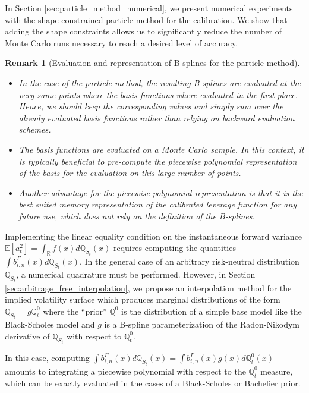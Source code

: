 \documentclass[a4paper]{article}
\newtheorem*{remark}{Remark}
\newcommand{\1}{\textbf{1}}
\newcommand{\Q}{\mathbb{Q}}
\newcommand{\R}{\mathbb{R}}
\newcommand{\E}{\mathbb{E}}
\begin{document}
\par In Section \ref{sec:particle_method_numerical}, we present numerical experiments with the shape-constrained particle method for the calibration. We show that adding the shape constraints allows us to significantly reduce the number of Monte Carlo runs necessary to reach a desired level of accuracy. 
\begin{remark}[Evaluation and representation of B-splines for the particle method]
\begin{itemize}
\item In the case of the particle method, the resulting B-splines are evaluated at the very same points where the basis functions where evaluated in the first place. Hence, we should keep the corresponding values and simply sum over the already evaluated basis functions rather than relying on backward evaluation schemes.
\item The basis functions are evaluated on a Monte Carlo sample. In this context, it is typically beneficial to pre-compute the piecewise polynomial representation of the basis for the evaluation on this large number of points.
\item Another advantage for the piecewise polynomial representation is that it is the best suited memory representation of the calibrated leverage function for any future use, which does not rely on the definition of the B-splines. 
\end{itemize}
\end{remark}
\par \noindent Implementing the linear equality condition on the instantaneous forward variance $\E\left[a_t^2\right] = \int_\R f(x) d\Q_{S_t}(x)$ requires computing the quantities $\int b^\Gamma_{i,n}(x) d\Q_{S_t}(x)$. In the general case of an arbitrary risk-neutral distribution $\Q_{S_t}$, a numerical quadrature must be performed. However, in Section \ref{sec:arbitrage_free_interpolation}, we propose an interpolation method for the implied volatility surface which produces marginal distributions of the form $\Q_{S_t} = g \Q^0_t$ where the ``prior'' $\Q^0$ is the distribution of a simple base model like the Black-Scholes model and $g$ is a B-spline parameterization of the Radon-Nikodym derivative of $\Q_{S_t}$ with respect to $\Q^0_t$.
\par In this case, computing $\int b^\Gamma_{i,n}(x) d\Q_{S_t}(x) = \int b^\Gamma_{i,n}(x) g(x) d\Q^0_t(x)$ amounts to integrating a piecewise polynomial with respect to the $\Q^0_t$ measure, which can be exactly evaluated in the cases of a Black-Scholes or Bachelier prior. 
\end{document}
